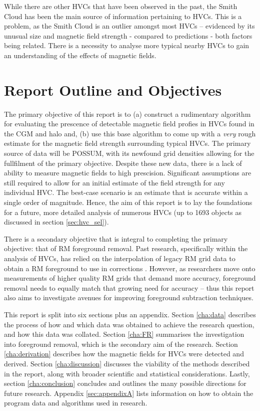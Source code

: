 While there are other HVCs that have been observed in the past, the Smith Cloud has been the main source of information pertaining to HVCs. This is a problem, as the Smith Cloud is an outlier amongst most HVCs – evidenced by its unusual size and magnetic field strength - compared to predictions - both factors being related. There is a necessity to analyse more typical nearby HVCs to gain an understanding of the effects of magnetic fields.

\section{Report Outline and Objectives}
\label{sec:outline}

The primary objective of this report is to (a) construct a rudimentary algorithm for evaluating the prescence of detectable magnetic field profies in HVCs found in the CGM and halo and, (b) use this base algorithm to come up with a \textit{very} rough estimate for the magnetic field strength surrounding typical HVCs. The primary source of data will be POSSUM, with its newfound grid densities allowing for the fullfilment of the primary objective. Despite these new data, there is a lack of ability to measure magnetic fields to high prescision. Significant assumptions are still required to allow for an initial estimate of the field strength for any individual HVC. The best-case scenario is an estimate that is accurate within a single order of magnitude. Hence, the aim of this report is to lay the foundations for a future, more detailed analysis of numerous HVCs (up to 1693 objects as discussed in section \ref{sec:hvc_sel}).


There is a secondary objective that is integral to completing the primary objective: that of RM foreground removal. Past research, specifically within the analysis of HVCs, has relied on the interpolation of legacy RM grid data to obtain a RM foreground to use in corrections \citep{ID21, ID26}. However, as researchers move onto measurements of higher quality RM grids that demand more accuracy, foreground removal needs to equally match that growing need for accuracy – thus this report also aims to investigate avenues for improving foreground subtraction techniques.


This report is split into six sections plus an appendix. Section \ref{cha:data} describes the process of how and which data was obtained to achieve the research question, and how this data was collated. Section \ref{cha:FR} summarises the investigation into foreground removal, which is the secondary aim of the research. Section \ref{cha:derivation} describes how the magnetic fields for HVCs were detected and derived. Section \ref{cha:discussion} discusses the viability of the methods described in the report, along with broader scientific and statistical considerations. Lastly, section \ref{cha:conclusion} concludes and outlines the many possible directions for future research. Appendix \ref{sec:appendixA} lists information on how to obtain the program data and algorithms used in research.

